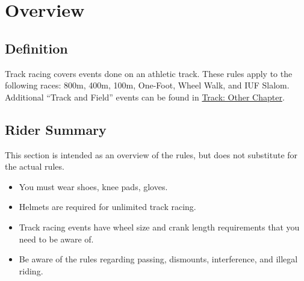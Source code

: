 \chapter{Overview}

\section{Definition}

Track racing covers events done on an athletic track.
These rules apply to the following races: 800m, 400m, 100m, One-Foot, Wheel Walk, and IUF Slalom.
Additional ``Track and Field'' events can be found in \hyperref[part:track-other]{Track: Other Chapter}.

\section{Rider Summary}

This section is intended as an overview of the rules, but does not substitute for the actual rules.
\begin{itemize}
\item You must wear shoes, knee pads, gloves.
\item Helmets are required for unlimited track racing.
\item Track racing events have wheel size and crank length requirements that you need to be aware of.
\item Be aware of the rules regarding passing, dismounts, interference, and illegal riding.
\end{itemize}
